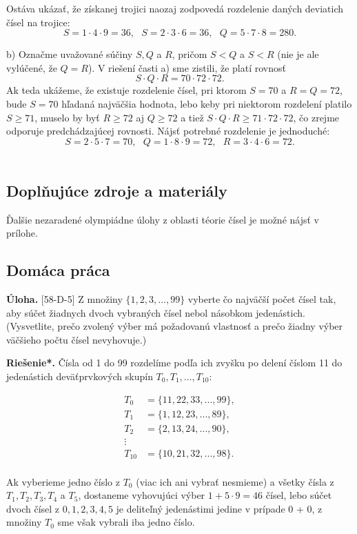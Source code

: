 \documentclass[11pt,a4paper,oneside,final]{book}
\newcommand{\ul}{\textbf{Úloha.} }
\newcommand{\rieh}{\textbf{Riešenie*.} }
\begin{document}
Ostáva ukázať, že získanej trojici naozaj zodpovedá rozdelenie daných deviatich čísel na trojice:
$$S = 1 \cdot 4 \cdot 9 = 36, \ \ \ S = 2 \cdot 3 \cdot 6 = 36, \ \ \ Q = 5 \cdot 7 \cdot 8 = 280.$$

b) Označme uvažované súčiny $S, Q$ a $R$, pričom $S < Q$ a $S < R$ (nie je ale vylúčené, že $Q = R$). V riešení časti a) sme zistili, že platí rovnosť
$$S \cdot Q \cdot R = 70 \cdot 72 \cdot 72.$$
Ak teda ukážeme, že existuje rozdelenie čísel, pri ktorom $S = 70$ a $R = Q = 72$, bude $S = 70$ hľadaná najväčšia hodnota, lebo keby pri niektorom rozdelení platilo $S \geq 71$, muselo by byť $R \geq 72$ aj $Q \geq 72$ a tiež $S \cdot Q \cdot R \geq 71 \cdot 72 \cdot 72$, čo zrejme odporuje predchádzajúcej rovnosti. Nájsť potrebné rozdelenie je jednoduché:
$$ S = 2 \cdot 5 \cdot 7 = 70, \ \ \ Q = 1 \cdot 8 \cdot 9 = 72, \ \ \  R = 3 \cdot 4 \cdot 6 = 72.$$ \\

\subsection*{Doplňujúce zdroje a materiály}
Ďalšie nezaradené olympiádne úlohy z oblasti téorie čísel je možné nájsť v prílohe.

\subsection*{Domáca práca}
\begin{tcolorbox}[breakable,notitle,boxrule=0pt,colback=light-gray,colframe=light-gray]\ul [58-D-5] Z množiny $\{1, 2, 3, \ldots, 99\}$ vyberte čo najväčší počet čísel tak, aby súčet žiadnych dvoch vybraných čísel nebol násobkom jedenástich. (Vysvetlite, prečo zvolený výber má požadovanú vlastnosť a prečo žiadny výber väčšieho počtu čísel nevyhovuje.)

\end{tcolorbox}

\rieh Čísla od 1 do 99 rozdelíme podľa ich zvyšku po delení číslom 11 do jedenástich deväťprvkových skupín $T_0, T_1 ,\ldots, T_ 10$:
\begin{center}
\begin{align*}
T_0 &= \{11, 22, 33, . . . , 99\},\\
T_1 &= \{1, 12, 23, . . . , 89\},\\
T_2 &= \{2, 13, 24, . . . , 90\},\\
\vdots\\
T_{10} &= \{10, 21, 32, . . . , 98\}.\\
\end{align*}
\end{center}
Ak vyberieme jedno číslo z $T_0$ (viac ich ani vybrať nesmieme) a všetky čísla z $T_1, T_2, T_3, T_4$ a $T_5$, dostaneme vyhovujúci výber $1 + 5 \cdot 9 = 46$ čísel, lebo súčet dvoch čísel z $0, 1, 2, 3, 4, 5$ je deliteľný jedenástimi jedine v prípade 0 + 0, z množiny $T_0$ sme však vybrali iba jedno číslo.
\end{document}
